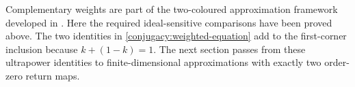 Complementary weights are part of the two-coloured approximation
framework developed in \cite{SWW,BBSTWW,CETWW}. Here the required
ideal-sensitive comparisons have been proved above. The two identities
in \eqref{conjugacy:weighted-equation} add to the first-corner inclusion
because $k+(1-k)=1$.  The next section
passes from these ultrapower identities to finite-dimensional
approximations with exactly two order-zero return maps.
